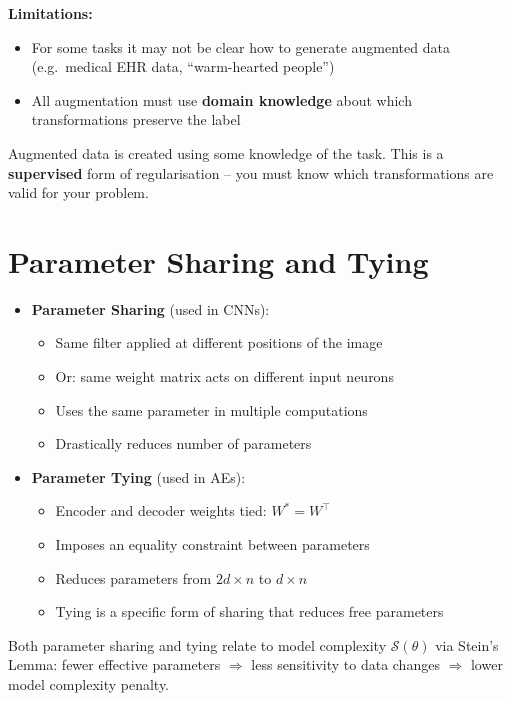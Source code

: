\documentclass[12pt,a4paper]{article}
\newcommand{\Reg}{\mathcal{S}}
\begin{document}
\textbf{Limitations:}
\begin{itemize}
  \item For some tasks it may not be clear how to generate augmented data (e.g.\ medical EHR data, ``warm-hearted people'')
  \item All augmentation must use \textbf{domain knowledge} about which transformations preserve the label
\end{itemize}

\begin{notebox}
Augmented data is created using some knowledge of the task. This is a \textbf{supervised} form of regularisation -- you must know which transformations are valid for your problem.
\end{notebox}

\section{Parameter Sharing and Tying}

\begin{itemize}
  \item \textbf{Parameter Sharing} (used in CNNs):
  \begin{itemize}
    \item Same filter applied at different positions of the image
    \item Or: same weight matrix acts on different input neurons
    \item Uses the same parameter in multiple computations
    \item Drastically reduces number of parameters
  \end{itemize}

  \item \textbf{Parameter Tying} (used in AEs):
  \begin{itemize}
    \item Encoder and decoder weights tied: $W^* = W^\top$
    \item Imposes an equality constraint between parameters
    \item Reduces parameters from $2d\times n$ to $d\times n$
    \item Tying is a specific form of sharing that reduces free parameters
  \end{itemize}
\end{itemize}

Both parameter sharing and tying relate to model complexity $\Reg(\theta)$ via Stein's Lemma: fewer effective parameters $\Rightarrow$ less sensitivity to data changes $\Rightarrow$ lower model complexity penalty.
\end{document}
